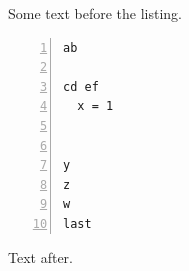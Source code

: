 \documentclass{article}
\begin{document}
Some text before the listing.
\begin{lstlisting}[numbers=left]
ab

cd ef
  x = 1


y
z
w
last

\end{lstlisting}
Text after.
\end{document}
